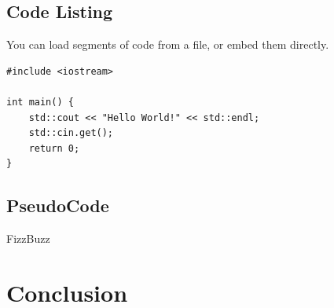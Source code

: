 \documentclass[10pt, a4paper]{article}
\begin{document}
	\subsection{Code Listing}
    You can load segments of code from a file, or embed them directly.
    
\begin{lstlisting}[caption = Hello World! in c++]
#include <iostream>

int main() {
    std::cout << "Hello World!" << std::endl;
    std::cin.get();
    return 0;
}
\end{lstlisting}

\subsection{PseudoCode}

\begin{algorithm}[h]
\caption{FizzBuzz}
\end{algorithm}
	
\section{Conclusion}	


		
\end{document}
